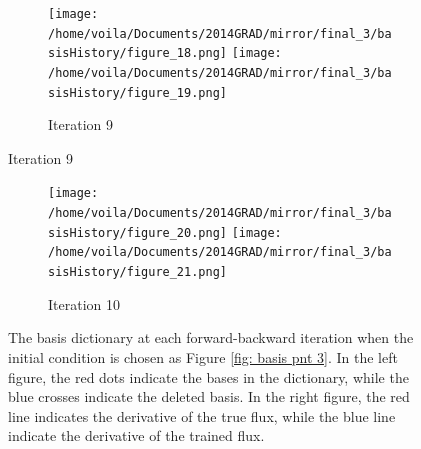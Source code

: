 \begin{figure}\ContinuedFloat
\begin{center}
    \begin{subfigure}[t]{1.\textwidth}
        \centering
        \texttt{[image: /home/voila/Documents/2014GRAD/mirror/final\_3/basisHistory/figure\_18.png]}
        \texttt{[image: /home/voila/Documents/2014GRAD/mirror/final\_3/basisHistory/figure\_19.png]}
        \caption{Iteration 9}
        \label{fig: basis history 9}
    \end{subfigure}   
\end{center}
\end{figure}
\begin{figure}\ContinuedFloat
\begin{center}
    \begin{subfigure}[t]{1.\textwidth}
        \centering
        \texttt{[image: /home/voila/Documents/2014GRAD/mirror/final\_3/basisHistory/figure\_20.png]}
        \texttt{[image: /home/voila/Documents/2014GRAD/mirror/final\_3/basisHistory/figure\_21.png]}
        \caption{Iteration 10}
        \label{fig: basis history 10}
    \end{subfigure}   
    \caption{The basis dictionary at each forward-backward iteration when the initial 
             condition is chosen as Figure \ref{fig: basis pnt 3}. 
             In the left figure, 
             the red dots indicate the bases in the dictionary, while 
             the blue crosses indicate the deleted
             basis. In the right figure, the red line indicates the derivative of the true flux,
             while the blue line indicate the derivative of the trained flux.}
    \label{fig: basis history}
\end{center}\end{figure}


